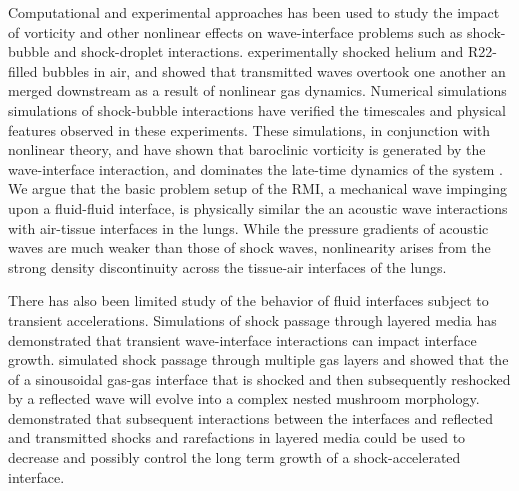 \documentclass{jfm}%
\begin{document}
Computational and experimental approaches has been used to study the
impact of vorticity and other nonlinear effects on wave-interface
problems such as shock-bubble and shock-droplet
interactions. \cite{Haast1987} experimentally shocked helium and
R22-filled bubbles in air, and showed that transmitted waves overtook
one another an merged downstream as a result of nonlinear gas
dynamics. Numerical simulations simulations of shock-bubble
interactions have verified the timescales and physical features
observed in these experiments. These simulations, in conjunction with
nonlinear theory, and have shown that baroclinic vorticity is
generated by the wave-interface interaction, and dominates the
late-time dynamics of the system \citep{Picone1988,Quirk1996}. We
argue that the basic problem setup of the \ac{RMI}, a mechanical wave
impinging upon a fluid-fluid interface, is physically similar the an
acoustic wave interactions with air-tissue interfaces in the
lungs. While the pressure gradients of acoustic waves are much weaker
than those of shock waves, nonlinearity arises from the strong density
discontinuity across the tissue-air interfaces of the lungs.

There has also been limited study of the behavior of fluid interfaces
subject to transient accelerations. Simulations of shock passage
through layered media has demonstrated that transient wave-interface
interactions can impact interface growth. \cite{Mikaelian1996}
simulated shock passage through multiple gas layers and showed that
the of a sinousoidal gas-gas interface that is shocked and then
subsequently reshocked by a reflected wave will evolve into a complex
nested mushroom morphology. \cite{HenrydeFrahan2015b} demonstrated
that subsequent interactions between the interfaces and reflected and
transmitted shocks and rarefactions in layered media could be used to
decrease and possibly control the long term growth of a
shock-accelerated interface.
\end{document}
